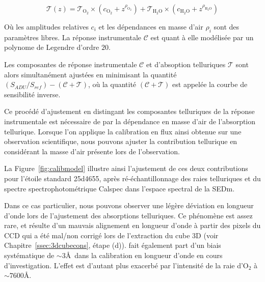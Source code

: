 \documentclass[../main/main.tex]{subfiles}
\begin{document}
\begin{equation*}
  \label{eq:telluricpysedm2}
  \mathcal{T}(z) =
  \mathcal{T}_{\text{O}_{2}}\times(c_{\text{O}_{2}}+z^{\rho_{\text{O}_{2}}})
  + \mathcal{T}_{\text{H}_{2}\text{O}}\times(c_{\text{H}_{2}\text{O}}+z^{\rho_{\text{H}_{2}\text{O}}})
\end{equation*}

Où les amplitudes relatives $c_{i}$ et les dépendances en masse d'air
$\rho_{i}$ sont des paramètres libres. La réponse instrumentale
$\mathcal{C}$ est quant à elle modélisée par un polynome de Legendre
d'ordre $20$.


Les composantes de réponse instrumentale $\mathcal{C}$ et
d'absoption telluriques $\mathcal{T}$ sont alors simultanément
ajustées en minimisant la quantité ~$(S_{ADU}/S_{ref}) - (\mathcal{C} +
\mathcal{T})$, où la quantité $(\mathcal{C} + \mathcal{T})$ est appelée la courbe de
sensibilité inverse.

Ce procédé d'ajustement en distingant les composantes telluriques de la
réponse instrumentale est nécessaire de par la dépendance en masse
d'air de l'absorption tellurique. Lorsque l'on applique la
calibration en flux ainsi obtenue sur une observation scientifique, nous
pouvons ajuster la contribution tellurique en considérant la masse d'air
présente lors de l'observation.

La Figure~\ref{fig:calibmodel} illustre ainsi l'ajustement de ces deux
contributions pour l'étoile standard 25d4655, après ré-échantillonnage
des raies telluriques et du spectre spectrophotométrique Calspec dans
l'espace spectral de la SEDm.

Dans ce cas particulier, nous pouvons
observer une légère déviation en longueur d'onde lors de l'ajustement
des absorptions telluriques. Ce phénomène est assez rare, et résulte
d'un mauvais alignement en longueur d'onde
à partir des pixels du CCD qui a été mal/non
corrigé lors de l'extraction du cube 3D (voir
Chapitre~\ref{ssec:3dcubecons}, étape (d)). \citet{pysedm} fait
également part d'un biais systématique de $\sim3$\AA\ dans la
calibration en longueur d'onde en cours d'investigation. L'effet est d'autant plus
exacerbé par l'intensité de la raie d'O$_{2}$ à $\sim7600$\AA.
\end{document}
